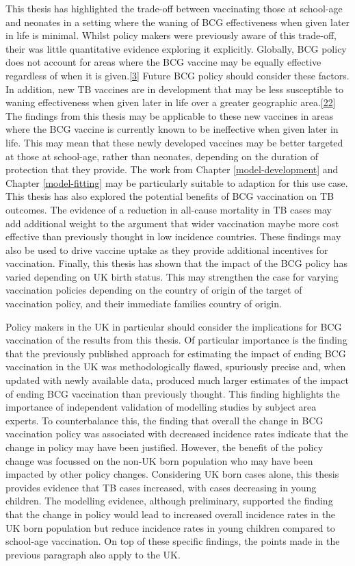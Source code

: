 \documentclass[11pt,twoside]{bristolthesis}
\begin{document}
  This thesis has highlighted the trade-off between vaccinating those at school-age and neonates in a setting where the waning of BCG effectiveness when given later in life is minimal. Whilst policy makers were previously aware of this trade-off, their was little quantitative evidence exploring it explicitly. Globally, BCG policy does not account for areas where the BCG vaccine may be equally effective regardless of when it is given.{[}\protect\hyperlink{ref-TheWorldHealthOrganization:2018va}{3}{]} Future BCG policy should consider these factors. In addition, new TB vaccines are in development that may be less susceptible to waning effectiveness when given later in life over a greater geographic area.{[}\protect\hyperlink{ref-Medicine2013}{22}{]} The findings from this thesis may be applicable to these new vaccines in areas where the BCG vaccine is currently known to be ineffective when given later in life. This may mean that these newly developed vaccines may be better targeted at those at school-age, rather than neonates, depending on the duration of protection that they provide. The work from Chapter \ref{model-development} and Chapter \ref{model-fitting} may be particularly suitable to adaption for this use case. This thesis has also explored the potential benefits of BCG vaccination on TB outcomes. The evidence of a reduction in all-cause mortality in TB cases may add additional weight to the argument that wider vaccination maybe more cost effective than previously thought in low incidence countries. These findings may also be used to drive vaccine uptake as they provide additional incentives for vaccination. Finally, this thesis has shown that the impact of the BCG policy has varied depending on UK birth status. This may strengthen the case for varying vaccination policies depending on the country of origin of the target of vaccination policy, and their immediate families country of origin.
  
  Policy makers in the UK in particular should consider the implications for BCG vaccination of the results from this thesis. Of particular importance is the finding that the previously published approach for estimating the impact of ending BCG vaccination in the UK was methodologically flawed, spuriously precise and, when updated with newly available data, produced much larger estimates of the impact of ending BCG vaccination than previously thought. This finding highlights the importance of independent validation of modelling studies by subject area experts. To counterbalance this, the finding that overall the change in BCG vaccination policy was associated with decreased incidence rates indicate that the change in policy may have been justified. However, the benefit of the policy change was focussed on the non-UK born population who may have been impacted by other policy changes. Considering UK born cases alone, this thesis provides evidence that TB cases increased, with cases decreasing in young children. The modelling evidence, although preliminary, supported the finding that the change in policy would lead to increased overall incidence rates in the UK born population but reduce incidence rates in young children compared to school-age vaccination. On top of these specific findings, the points made in the previous paragraph also apply to the UK.
  
\end{document}
